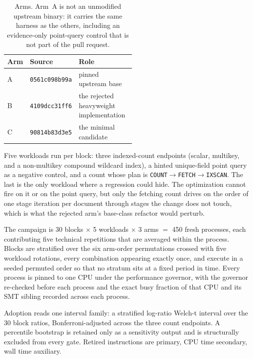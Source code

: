 \documentclass[10pt]{article}
\newcommand{\code}[1]{\texttt{#1}}
\newcommand{\hdr}{\rowcolor{hdrgray}}
\newenvironment{ctab}{\par\smallskip\centering\small
  \setlength{\tabcolsep}{5pt}\renewcommand{\arraystretch}{1.12}}{\par\smallskip}
\begin{document}
\begin{table}[H]
\caption{Arms. Arm~A is not an unmodified upstream binary: it carries the same
harness as the others, including an evidence-only point-query control that is
not part of the pull request.}
\label{tab:countscan-arms}
\begin{ctab}
\setlength{\tabcolsep}{7pt}
\begin{tabular}{@{}llp{0.52\linewidth}@{}}
\toprule
\hdr Arm & Source & Role \\
\midrule
A & \code{0561c098b99a} & pinned upstream base \\
B & \code{4109dcc31ff6} & the rejected heavyweight implementation \\
C & \code{90814b83d3e5} & the minimal candidate \\
\bottomrule
\end{tabular}
\end{ctab}
\end{table}

Five workloads run per block: three indexed-count endpoints (scalar, multikey,
and a non-multikey compound wildcard index), a hinted unique-field point query
as a negative control, and a count whose plan is
\code{COUNT}$\rightarrow$\code{FETCH}$\rightarrow$\code{IXSCAN}. The last is the
only workload where a regression could hide. The optimization cannot fire on it
or on the point query, but only the fetching count drives on the order of one
stage iteration per document through stages the change does not touch, which is
what the rejected arm's base-class refactor would perturb.

The campaign is 30 blocks $\times$ 5 workloads $\times$ 3 arms $=$ 450 fresh
processes, each contributing five technical repetitions that are averaged within
the process. Blocks are stratified over the six arm-order permutations crossed
with five workload rotations, every combination appearing exactly once, and
execute in a seeded permuted order so that no stratum sits at a fixed period in
time. Every process is pinned to one CPU under the performance governor, with
the governor re-checked before each process and the exact busy fraction of that
CPU and its SMT sibling recorded across each process.

Adoption reads one interval family: a stratified log-ratio Welch-t interval over
the 30 block ratios, Bonferroni-adjusted across the three count endpoints. A
percentile bootstrap is retained only as a sensitivity output and is
structurally excluded from every gate. Retired instructions are primary, CPU
time secondary, wall time auxiliary.
\end{document}
